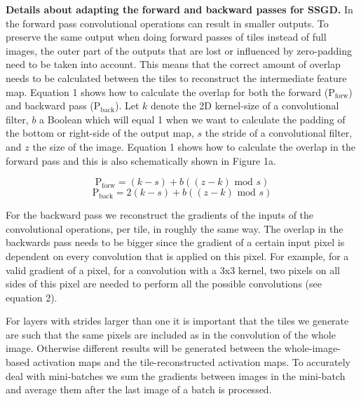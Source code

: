 \documentclass{article}
\begin{document}
\textbf{Details about adapting the forward and backward passes for SSGD.} In the forward pass convolutional operations can result in smaller outputs. To preserve the same output when doing forward passes of tiles instead of full images, the outer part of the outputs that are lost or influenced by zero-padding need to be taken into account. This means that the correct amount of overlap needs to be calculated between the tiles to reconstruct the intermediate feature map. Equation 1 shows how to calculate the overlap for both the forward ($\text{P}_\text{forw}$) and backward pass ($\text{P}_\text{back}$). Let \(k\) denote the 2D kernel-size of a convolutional filter, \(b\) a Boolean which will equal 1 when we want to calculate the padding of the bottom or right-side of the output map, \(s\) the stride of a convolutional filter, and \(z\) the size of the image. Equation 1 shows how to calculate the overlap in the forward pass and this is also schematically shown in Figure 1a.

\footnotesize
\scriptsize
  \begin{equation}
  \text{P}_\text{forw} = (k - s) + b((z - k) \text{ mod } s)
  \end{equation}
  \begin{equation}
  \text{P}_\text{back} = 2(k - s) + b((z - k) \text{ mod } s)
  \end{equation}
\normalsize

For the backward pass we reconstruct the gradients of the inputs of the convolutional operations, per tile, in roughly the same way. The overlap in the backwards pass needs to be bigger since the gradient of a certain input pixel is dependent on every convolution that is applied on this pixel. For example, for a valid gradient of a pixel, for a convolution with a 3x3 kernel, two pixels on all sides of this pixel are needed to perform all the possible convolutions (see equation 2).

For layers with strides larger than one it is important that the tiles we generate are such that the same pixels are included as in the convolution of the whole image. Otherwise different results will be generated between the whole-image-based activation maps and the tile-reconstructed activation maps. To accurately deal with mini-batches we sum the gradients between images in the mini-batch and average them after the last image of a batch is processed. 
\end{document}
